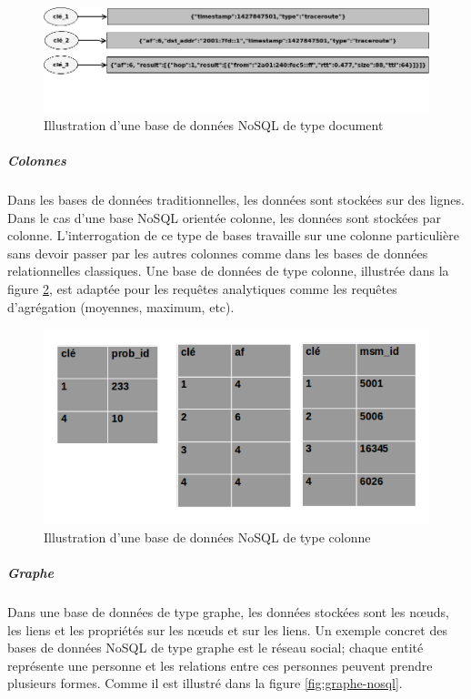 		\begin{figure}[H]
			\centering
			\includegraphics[width=1\linewidth]{illustrations/document-nosql}
			\caption{Illustration d'une base de données NoSQL de type document}
			\label{fig:document-nosql}
		\end{figure}
	

		\subparagraph{Colonnes} Dans les bases de données traditionnelles, les données sont stockées sur des lignes. Dans le cas d'une base NoSQL orientée colonne, les données sont stockées par colonne. L'interrogation de ce type de bases travaille sur une colonne particulière sans devoir passer par les autres colonnes comme dans les bases de données relationnelles classiques. Une base de données de type colonne, illustrée dans la figure  	\ref{fig:comomn-nosql}, est adaptée pour les requêtes analytiques comme les requêtes d'agrégation (moyennes, maximum, etc).

	
	\begin{figure}[H]
		\centering
		\includegraphics[width=0.7\linewidth]{illustrations/colomn-nosql.png}
		\caption{Illustration d'une base de données NoSQL de type colonne}
		\label{fig:comomn-nosql}
	\end{figure}
	

	\subparagraph{Graphe} Dans une base de données de type graphe, les données stockées sont les n\oe{}uds, les liens et les propriétés sur les n\oe{}uds et sur les liens. Un exemple concret des bases de données NoSQL de type graphe est le réseau social; chaque entité représente une personne et les relations entre ces personnes peuvent prendre plusieurs formes. Comme il est illustré dans la figure  	\ref{fig:graphe-nosql}.

